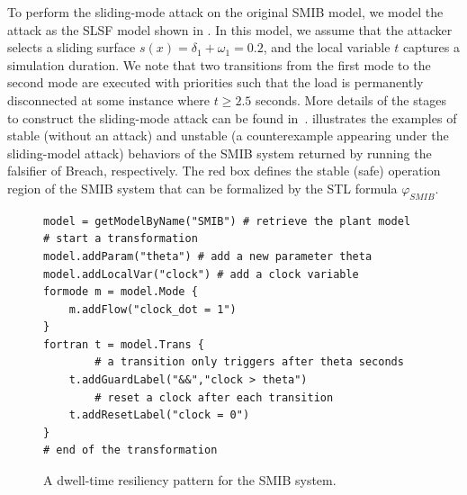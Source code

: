 %
%
To perform the sliding-mode attack on the original SMIB model, we model the attack as the SLSF model shown in . In this model, we assume that the attacker selects a sliding surface $s(x) = \delta_1 + \omega_1 = 0.2$, and the local variable $t$ captures a simulation duration. We note that two transitions from the first mode to the second mode are executed with priorities such that the load is permanently disconnected at some instance where $t \geq 2.5$ seconds. More details of the stages to construct the sliding-mode attack can be found in~\cite{farraj2014practical}. 
%
%
 illustrates the examples of stable (\ie without an attack) and unstable (\ie a counterexample appearing under the sliding-model attack) behaviors of the SMIB system returned by running the falsifier of Breach, respectively. The red box defines the stable (safe) operation region of the SMIB system that can be formalized by the STL formula $\varphi_{SMIB}$.
%
\begin{figure}[!t]%
\begin{lstlisting}[basicstyle=\ttfamily\footnotesize, numbers=none]
model = getModelByName("SMIB") # retrieve the plant model	
# start a transformation  
model.addParam("theta") # add a new parameter theta
model.addLocalVar("clock") # add a clock variable
formode m = model.Mode {
    m.addFlow("clock_dot = 1")
}
fortran t = model.Trans {
		# a transition only triggers after theta seconds
    t.addGuardLabel("&&","clock > theta") 
		# reset a clock after each transition
    t.addResetLabel("clock = 0") 
}
# end of the transformation
\end{lstlisting}
	\vspace{-0.5em}
\caption{A dwell-time resiliency pattern for the SMIB system.}%
\vspace{-1em}
%
\end{figure}

